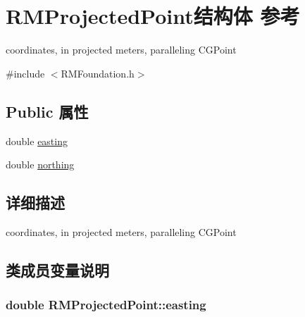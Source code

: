 \hypertarget{struct_r_m_projected_point}{\section{R\-M\-Projected\-Point结构体 参考}
\label{struct_r_m_projected_point}
}


coordinates, in projected meters, paralleling C\-G\-Point  




{\ttfamily \#include $<$R\-M\-Foundation.\-h$>$}

\subsection*{Public 属性}
\begin{DoxyCompactItemize}
\item 
double \hyperlink{struct_r_m_projected_point_a7c1e29e4ba7b036c58f7c18432a53558}{easting}
\item 
double \hyperlink{struct_r_m_projected_point_a3fb51e009314ab276305916e6a881668}{northing}
\end{DoxyCompactItemize}


\subsection{详细描述}
coordinates, in projected meters, paralleling C\-G\-Point 

\subsection{类成员变量说明}
\hypertarget{struct_r_m_projected_point_a7c1e29e4ba7b036c58f7c18432a53558}{
\subsubsection[{easting}]{\setlength{\rightskip}{0pt plus 5cm}double R\-M\-Projected\-Point\-::easting}}\label{struct_r_m_projected_point_a7c1e29e4ba7b036c58f7c18432a53558}


